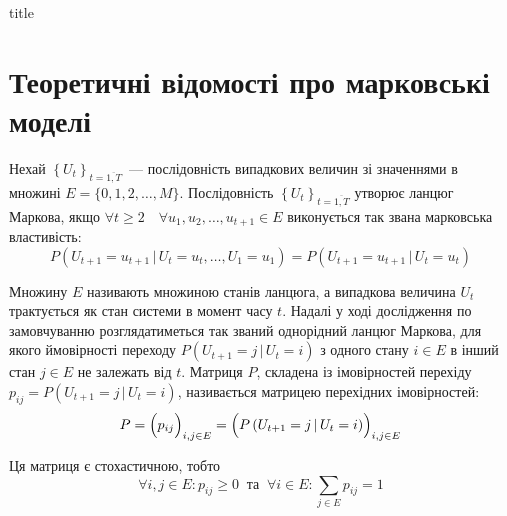 \documentclass{mathreport}
\begin{document}




{title}

\tableofcontents

\newpage

\section*{Теоретичні відомості про марковські моделі}

Нехай $\left\{ U_t \right\}_{t=\overline{1,T}}$~--- послідовність випадкових величин зі значеннями в множині $E=\{ 0,1,2,\ldots,M \}$. Послідовність $\left\{ U_t \right\}_{t=\overline{1,T}}$ утворює ланцюг Маркова, якщо $\forall t\geqslant 2 \quad \forall u_1,u_2,\ldots,u_{t+1} \in E$ виконується так звана марковська властивість:
\begin{equation}\label{eq: Markov chain definition}
    P\left( U_{t+1}=u_{t+1} \,|\, U_t=u_t,\ldots,U_1=u_1 \right) = P\left( U_{t+1}=u_{t+1} \,|\, U_t=u_t \right)
\end{equation}

Множину $E$ називають множиною станів ланцюга, а випадкова величина $U_t$ трактується як стан системи в момент часу $t$. Надалі у ході дослідження по замовчуванню розглядатиметься так званий однорідний ланцюг Маркова, для якого ймовірності переходу $P\left( U_{t+1}=j \,|\, U_{t}=i \right)$ з одного стану $i \in E$ в інший стан $j \in E$ не залежать від $t$. Матриця $P$, складена із імовірностей перехіду $p_{ij} = P\left( U_{t+1}=j \,|\, U_{t}=i \right)$, називається матрицею перехідних імовірностей:
\begin{equation}\label{eq: transition matrix}
    P = \Bigl( p_{ij} \Bigr)_{i,j \in E} = \Bigl( P\left( U_{t+1}=j \,|\, U_{t}=i \right) \Bigr)_{i,j \in E}
\end{equation} 

Ця матриця є стохастичною, тобто
\begin{equation}\label{eq: stohastic conditions}
    \forall i,j \in E: p_{ij} \geqslant 0\ \text{ та }\ \forall i \in E: \sum\limits_{j \in E} p_{ij} = 1
\end{equation}
\end{document}
